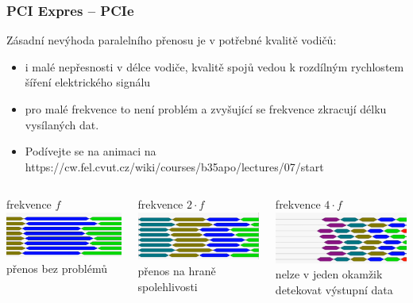\documentclass{beamer}
\begin{document}
\begin{frame}
\frametitle{PCI Expres -- PCIe}

Zásadní nevýhoda paralelního přenosu je v potřebné kvalitě vodičů:
\begin{itemize}
\item i malé nepřesnosti v délce vodiče, kvalitě spojů vedou k rozdílným rychlostem šíření elektrického signálu
\item pro malé frekvence to není problém a zvyšující se frekvence zkracují délku vysílaných dat.
\item Podívejte se na animaci na https://cw.fel.cvut.cz/wiki/courses/b35apo/lectures/07/start
\end{itemize}
\bigskip

\begin{columns}[T]
\begin{column}{0.32\textwidth}  
frekvence $f$
\includegraphics[width=\textwidth]{fig/freq1.png}
přenos bez problémů
\end{column}
\begin{column}{0.32\textwidth}  
frekvence $2\cdot f$
\includegraphics[width=\textwidth]{fig/freq2.png}
přenos na hraně spolehlivosti
\end{column}
\begin{column}{0.32\textwidth}  
frekvence $4\cdot f$
\includegraphics[width=\textwidth]{fig/freq4.png}
nelze v jeden okamžik detekovat výstupní data
\end{column}
\end{columns}

\end{frame}
\end{document}
